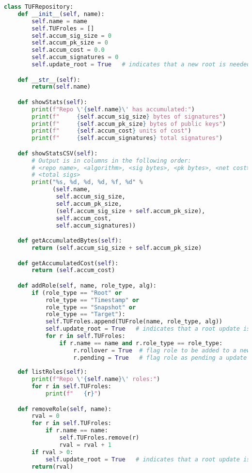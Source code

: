 \documentclass{article}
\begin{document}
\begin{lstlisting}[language=Python, basicstyle=\tiny]
class TUFRepository:
    def __init__(self, name):
        self.name = name
        self.TUFroles = []
        self.accum_sig_size = 0
        self.accum_pk_size = 0
        self.accum_cost = 0.0
        self.accum_signatures = 0
        self.update_root = True   # indicates that a new root is needed

    def __str__(self):
        return(self.name)

    def showStats(self):
        print(f"Repo \'{self.name}\' has accumulated:")
        print(f"     {self.accum_sig_size} bytes of signatures")
        print(f"     {self.accum_pk_size} bytes of public keys")
        print(f"     {self.accum_cost} units of cost")
        print(f"     {self.accum_signatures} total signatures")

    def showStatsCSV(self):
        # Output is in columns in the following order:
        # <repo name>, <algorithm>, <sig bytes>, <pk bytes>, <net cost>,
        # <total sigs>
        print("%s, %d, %d, %d, %f, %d" %
              (self.name,
               self.accum_sig_size,
               self.accum_pk_size,
               (self.accum_sig_size + self.accum_pk_size),
               self.accum_cost,
               self.accum_signatures))

    def getAccumulatedBytes(self):
        return (self.accum_sig_size + self.accum_pk_size)

    def getAccumulatedCost(self):
        return (self.accum_cost)

    def addRole(self, name, role_type, alg):
        if (role_type == "Root" or
            role_type == "Timestamp" or
            role_type == "Snapshot" or
            role_type == "Target"):
            self.TUFroles.append(TUFrole(name, role_type, alg))
            self.update_root = True   # indicates that a root update is needed
            for r in self.TUFroles:
                if r.name == name and r.role_type == role_type:
                    r.rollover = True  # flag role to be added to a new root.txt
                    r.pending = True   # flag role as pending a update
                
    def listRoles(self):
        print(f"Repo \'{self.name}\' roles:")
        for r in self.TUFroles:
            print(f"   {r}")

    def removeRole(self, name):
        rval = 0
        for r in self.TUFroles:
            if r.name == name:
                self.TUFroles.remove(r)
                rval = rval + 1
        if rval > 0:
            self.update_root = True   # indicates that a root update is needed
        return(rval)


\end{lstlisting}
\end{document}
